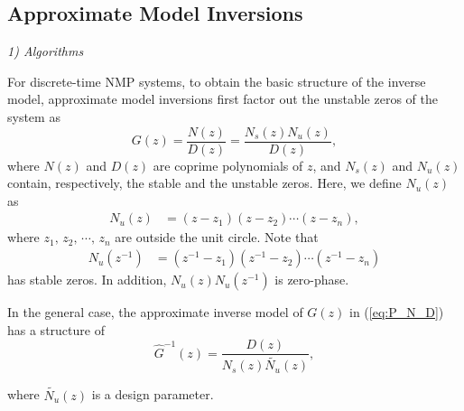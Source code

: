 \documentclass [11pt, proquest] {uwthesis}[2020/02/24]
\begin{document}
\subsection{\label{subsec:Approximate-model-inversions}Approximate Model Inversions}

\noindent \emph{1) Algorithms}

For discrete-time NMP systems, to obtain the basic structure of the
inverse model, approximate model inversions \cite{butterworth_analysis_2012,dai2019quantitative,Butterworth2008,Tomizuka1987}
first factor out the unstable zeros of the system as
\begin{equation}
G(z)=\frac{N(z)}{D(z)}=\frac{N_{s}(z)N_{u}(z)}{D(z)},\label{eq:P_N_D}
\end{equation}
where $N(z)$ and $D(z)$ are coprime polynomials of $z$, and $N_{s}(z)$
and $N_{u}(z)$ contain, respectively, the stable and the unstable
zeros. Here, we define $N_{u}(z)$ as
\begin{align}
N_{u}(z) & =(z-z_{1})(z-z_{2})\cdots(z-z_{n}),\label{eq:N_zeros}
\end{align}
where $z_{1},\,z_{2},\,\cdots,\,z_{n}$ are outside the unit circle.
Note that
\begin{align*}
N_{u}(z^{-1}) & =(z^{-1}-z_{1})(z^{-1}-z_{2})\cdots(z^{-1}-z_{n})
\end{align*}
has stable zeros. In addition, $N_{u}(z)N_{u}(z^{-1})$ is zero-phase.

In the general case, the approximate inverse model of $G(z)$ in (\ref{eq:P_N_D})
has a structure of
\begin{equation}
\hat{G}^{-1}(z)=\frac{D(z)}{N_{s}(z)\tilde{N_{u}}(z)},\label{eq:G_hat_inv}
\end{equation}

\noindent where $\tilde{N_{u}}(z)$ is a design parameter.
\end{document}
